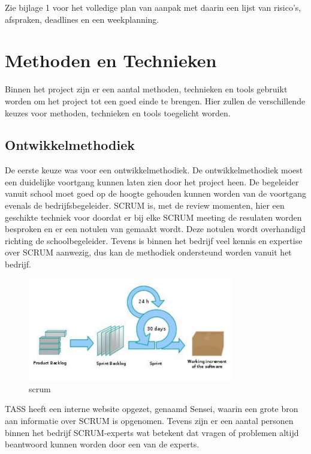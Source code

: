 \documentclass[]{article}
\begin{document}
Zie bijlage 1 voor het volledige plan van aanpak met daarin een lijst  van
risico's,  afspraken,  deadlines  en  een weekplanning.

\newpage
\section{Methoden en Technieken}

Binnen het project zijn er een aantal methoden, technieken en tools
gebruikt worden om het project tot een goed einde te brengen. Hier zullen de
verschillende keuzes voor methoden, technieken en tools toegelicht worden.

\subsection{Ontwikkelmethodiek}
De eerste keuze was voor een ontwikkelmethodiek. De ontwikkelmethodiek
moest een duidelijke voortgang kunnen laten zien door het project heen. De
begeleider vanuit school moet goed op de hoogte gehouden kunnen worden van
de voortgang evenals de bedrijfsbegeleider. SCRUM is, met de review
momenten, hier een geschikte techniek voor doordat er bij elke SCRUM meeting de
resulaten worden besproken en er een notulen van gemaakt wordt. Deze notulen wordt
overhandigd richting de schoolbegeleider. Tevens is binnen het bedrijf veel
kennis en expertise over SCRUM aanwezig, dus kan de methodiek ondersteund worden
vanuit het bedrijf.

\begin{figure}[htpb]
  \begin{center}
    \includegraphics[width=0.80\textwidth]{scrum.pdf}
  \end{center}
  \caption{scrum}
\end{figure}

TASS heeft een interne website opgezet, genaamd Sensei, waarin
een grote bron aan informatie over SCRUM is opgenomen. Tevens zijn er een
aantal personen binnen het bedrijf SCRUM-experts wat betekent dat vragen of
problemen altijd beantwoord kunnen worden door een van de experts.
\end{document}
